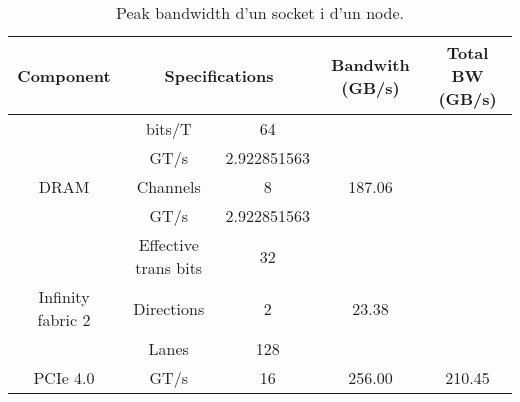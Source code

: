 \begin{table}[h]
\begin{tabular}{c|c|c||c|c}
    \hline
Component                           & \multicolumn{2}{c||}{Specifications}                                         & Bandwith (GB/s)          & Total BW (GB/s)          \\ \hline  \hline 
                                    & \cellcolor[HTML]{EFEFEF}bits/T               & \cellcolor[HTML]{EFEFEF}64  &                          &                          \\
                                    & GT/s                                         & 2.922851563                 &                          &                          \\
    \multirow{-3}{*}{DRAM}              & \cellcolor[HTML]{EFEFEF}Channels             & \cellcolor[HTML]{EFEFEF}8   & \multirow{-3}{*}{187.06} &                          \\ \cline{1-4}
                                    & GT/s                                         & 2.922851563                 &                          &                          \\
                                    & \cellcolor[HTML]{EFEFEF}Effective trans bits & \cellcolor[HTML]{EFEFEF}32  &                          &                          \\
    \multirow{-3}{*}{Infinity fabric 2} & Directions                                   & 2                           & \multirow{-3}{*}{23.38}  &                          \\ \cline{1-4}
                                    & \cellcolor[HTML]{EFEFEF}Lanes                & \cellcolor[HTML]{EFEFEF}128 &                          &                          \\
\multirow{-2}{*}{PCIe 4.0}          & GT/s                                         & 16                          & \multirow{-2}{*}{256.00} & \multirow{-8}{*}{210.45} \\ \hline
\end{tabular}
    \caption{Peak bandwidth d'un socket i d'un node.}
    \label{tab:peak_bw}
\end{table}


